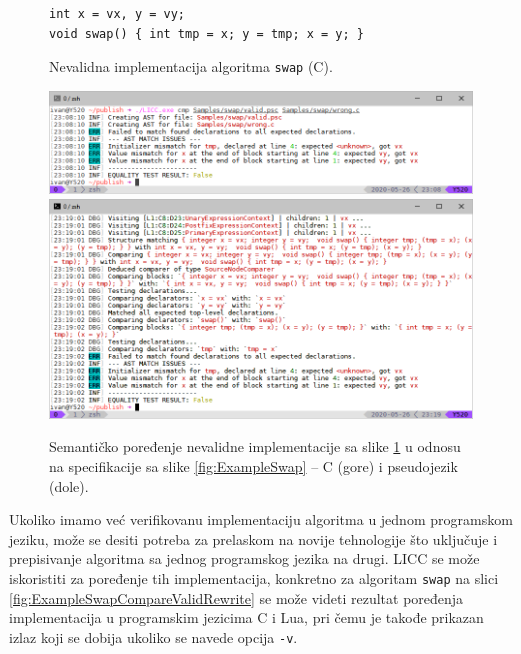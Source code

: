 \begin{figure}[h!]
\begin{lstlisting}
int x = vx, y = vy;
void swap() { int tmp = x; y = tmp; x = y; }
\end{lstlisting}
\caption{Nevalidna implementacija algoritma \texttt{swap} (C).}
\label{fig:ExampleSwapWrong}
\end{figure}

\begin{figure}[h!]
\centering
\includegraphics[scale=0.65]{images/eval/cmp_wrong.png}
\includegraphics[scale=0.65]{images/eval/cmp_wrong_v.png}
\caption{Semantičko poređenje nevalidne implementacije sa slike \ref{fig:ExampleSwapWrong} u odnosu na specifikacije sa slike \ref{fig:ExampleSwap} -- C (gore) i pseudojezik (dole).}
\label{fig:ExampleSwapCompareWrong}
\end{figure}

Ukoliko imamo već verifikovanu implementaciju algoritma u jednom programskom jeziku, može se desiti potreba za prelaskom na novije tehnologije što uključuje i prepisivanje algoritma sa jednog programskog jezika na drugi. LICC se može iskoristiti za poređenje tih implementacija, konkretno za algoritam \texttt{swap} na slici \ref{fig:ExampleSwapCompareValidRewrite} se može videti rezultat poređenja implementacija u programskim jezicima C i Lua, pri čemu je takođe prikazan izlaz koji se dobija ukoliko se navede opcija \texttt{-v}. 

